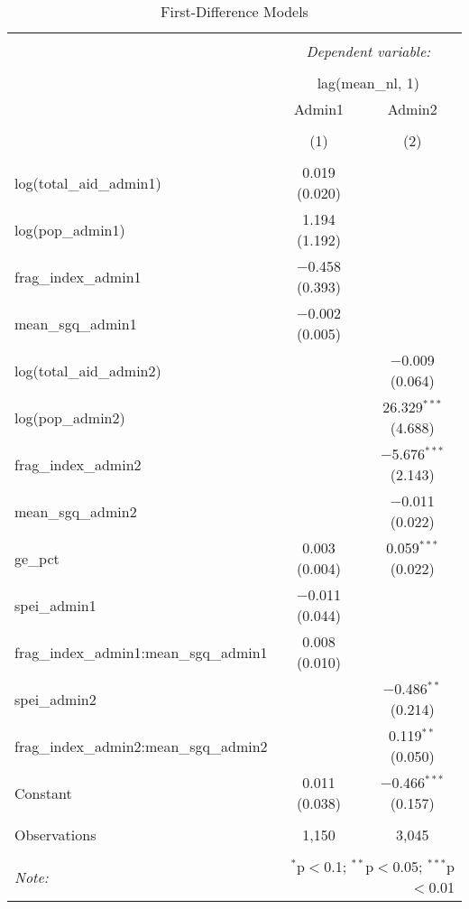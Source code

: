 
\begin{table}[!htbp] \centering 
  \caption{First-Difference Models} 
  \label{} 
\begin{tabular}{@{\extracolsep{5pt}}lcc} 
\\[-1.8ex]\hline 
\hline \\[-1.8ex] 
 & \multicolumn{2}{c}{\textit{Dependent variable:}} \\ 
\cline{2-3} 
\\[-1.8ex] & \multicolumn{2}{c}{lag(mean\_nl, 1)} \\ 
 & Admin1 & Admin2 \\ 
\\[-1.8ex] & (1) & (2)\\ 
\hline \\[-1.8ex] 
 log(total\_aid\_admin1) & 0.019 (0.020) &  \\ 
  log(pop\_admin1) & 1.194 (1.192) &  \\ 
  frag\_index\_admin1 & $-$0.458 (0.393) &  \\ 
  mean\_sgq\_admin1 & $-$0.002 (0.005) &  \\ 
  log(total\_aid\_admin2) &  & $-$0.009 (0.064) \\ 
  log(pop\_admin2) &  & 26.329$^{***}$ (4.688) \\ 
  frag\_index\_admin2 &  & $-$5.676$^{***}$ (2.143) \\ 
  mean\_sgq\_admin2 &  & $-$0.011 (0.022) \\ 
  ge\_pct & 0.003 (0.004) & 0.059$^{***}$ (0.022) \\ 
  spei\_admin1 & $-$0.011 (0.044) &  \\ 
  frag\_index\_admin1:mean\_sgq\_admin1 & 0.008 (0.010) &  \\ 
  spei\_admin2 &  & $-$0.486$^{**}$ (0.214) \\ 
  frag\_index\_admin2:mean\_sgq\_admin2 &  & 0.119$^{**}$ (0.050) \\ 
  Constant & 0.011 (0.038) & $-$0.466$^{***}$ (0.157) \\ 
 \hline \\[-1.8ex] 
Observations & 1,150 & 3,045 \\ 
\hline 
\hline \\[-1.8ex] 
\textit{Note:}  & \multicolumn{2}{r}{$^{*}$p$<$0.1; $^{**}$p$<$0.05; $^{***}$p$<$0.01} \\ 
\end{tabular} 
\end{table} 

